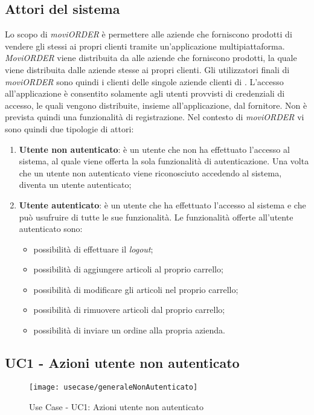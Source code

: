 \subsection{Attori del sistema}

Lo scopo di \textit{moviORDER} è permettere alle aziende che forniscono prodotti di vendere gli stessi ai propri clienti tramite un'applicazione multipiattaforma. \textit{MoviORDER} viene distribuita da \visione{} alle aziende che forniscono prodotti, la quale viene distribuita dalle aziende stesse ai propri clienti. Gli utilizzatori finali di \textit{moviORDER} sono quindi i clienti delle singole aziende clienti di \visione{}.
L'accesso all'applicazione è consentito solamente agli utenti provvisti di credenziali di accesso, le quali vengono distribuite, insieme all'applicazione, dal fornitore. Non è prevista quindi una funzionalità di registrazione. Nel contesto di \textit{moviORDER} vi sono quindi due tipologie di attori:
\begin{enumerate}
	\item \textbf{Utente non autenticato}: è un utente che non ha effettuato l'accesso al sistema, al quale viene offerta la sola funzionalità di autenticazione. Una volta che un utente non autenticato viene riconosciuto accedendo al sistema, diventa un utente autenticato;
	\item \textbf{Utente autenticato}: è un utente che ha effettuato l'accesso al sistema e che può usufruire di tutte le sue funzionalità. Le funzionalità offerte all'utente autenticato sono:
	\begin{itemize}
		\item possibilità di effettuare il \textit{logout};
		\item possibilità di aggiungere articoli al proprio carrello;
		\item possibilità di modificare gli articoli nel proprio carrello;
		\item possibilità di rimuovere articoli dal proprio carrello;
		\item possibilità di inviare un ordine alla propria azienda.
	\end{itemize}
\end{enumerate}

\subsection{UC1 - Azioni utente non autenticato}

\begin{figure}[!h] 
    \centering 
    \texttt{[image: usecase/generaleNonAutenticato]} 
    \caption{Use Case - UC1: Azioni utente non autenticato}
\end{figure}

